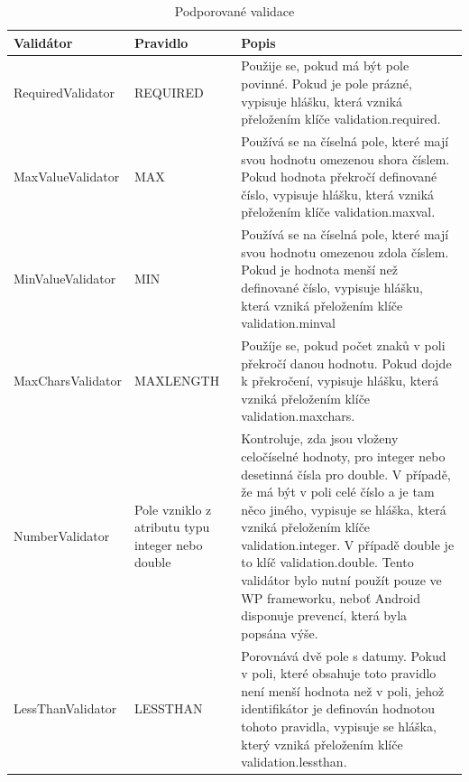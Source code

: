 \begin{table}[h!]
\begin{center}
\caption{Podporované validace}
\label{table:validations}
\begin{tabular}{|p{3.5cm}|p{4.5cm}|p{7cm}|}
\hline
\textbf{Validátor} & \textbf{Pravidlo} & \textbf{Popis} \\
\hline
RequiredValidator & 
REQUIRED & Použije se, pokud má být pole povinné. Pokud je pole prázné, vypisuje hlášku, která vzniká přeložením klíče validation.required. \\
\hline
MaxValueValidator &
MAX & Používá se na číselná pole, které mají svou hodnotu omezenou shora číslem. Pokud hodnota překročí definované číslo, vypisuje hlášku, která vzniká přeložením klíče validation.maxval. \\
\hline
MinValueValidator & MIN &
Používá se na číselná pole, které mají svou hodnotu omezenou zdola číslem. Pokud je hodnota menší než definované číslo, vypisuje hlášku, která vzniká přeložením klíče validation.minval \\
\hline
MaxCharsValidator & MAXLENGTH &
Použíje se, pokud počet znaků v poli překročí danou hodnotu. Pokud dojde k překročení, vypisuje hlášku, která vzniká přeložením klíče validation.maxchars.\\
\hline
NumberValidator & Pole vzniklo z atributu typu integer nebo double &
Kontroluje, zda jsou vloženy celočíselné hodnoty, pro integer nebo desetinná čísla pro double. V případě, že má být v poli celé číslo a je tam něco jiného, vypisuje se hláška, která vzniká přeložením klíče validation.integer. V případě double je to klíč validation.double. 
Tento validátor bylo nutní použít pouze ve WP frameworku, neboť Android disponuje prevencí, která byla popsána výše.\\
\hline
LessThanValidator & LESSTHAN &
Porovnává dvě pole s datumy. Pokud v poli, které obsahuje toto pravidlo není menší hodnota než v poli, jehož identifikátor je definován hodnotou tohoto pravidla, vypisuje se hláška, který vzniká přeložením klíče validation.lessthan.  \\
\hline
\end{tabular}
\end{center}
\end{table}

